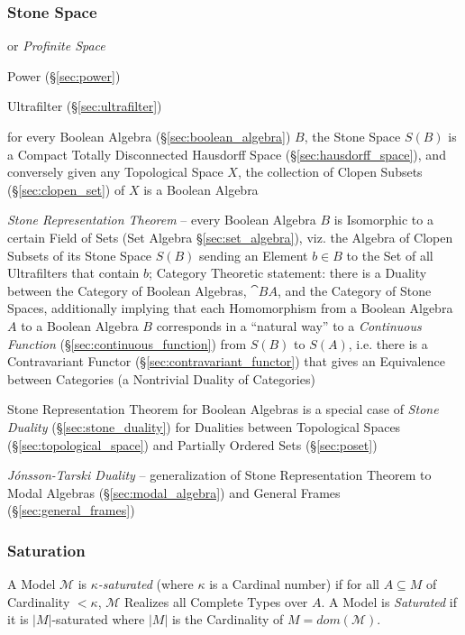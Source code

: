 \subsubsection{Stone Space}\label{sec:stone_space}

or \emph{Profinite Space}

Power (\S\ref{sec:power})

Ultrafilter (\S\ref{sec:ultrafilter})

for every Boolean Algebra (\S\ref{sec:boolean_algebra}) $B$, the Stone Space
$\xspace{S}(B)$ is a Compact Totally Disconnected Hausdorff Space
(\S\ref{sec:hausdorff_space}), and conversely given any Topological Space $X$,
the collection of Clopen Subsets (\S\ref{sec:clopen_set}) of $X$ is a Boolean
Algebra

\emph{Stone Representation Theorem} -- every Boolean Algebra $B$ is Isomorphic
to a certain Field of Sets (Set Algebra \S\ref{sec:set_algebra}), viz. the
Algebra of Clopen Subsets of its Stone Space $\xspace{S}(B)$ sending an Element
$b \in B$ to the Set of all Ultrafilters that contain $b$; Category Theoretic
statement: there is a Duality between the Category of Boolean Algebras,
$\cat{BA}$, and the Category of Stone Spaces, additionally implying that each
Homomorphism from a Boolean Algebra $A$ to a Boolean Algebra $B$ corresponds in
a ``natural way'' to a \emph{Continuous Function}
(\S\ref{sec:continuous_function}) from $S(B)$ to $S(A)$, i.e. there is a
Contravariant Functor (\S\ref{sec:contravariant_functor}) that gives an
Equivalence between Categories (a Nontrivial Duality of Categories)

\fist Stone Representation Theorem for Boolean Algebras is a special case of
\emph{Stone Duality} (\S\ref{sec:stone_duality}) for Dualities between
Topological Spaces (\S\ref{sec:topological_space}) and Partially Ordered Sets
(\S\ref{sec:poset})

\fist \emph{J\'onsson-Tarski Duality} --
generalization of Stone Representation Theorem to Modal Algebras
(\S\ref{sec:modal_algebra}) and General Frames (\S\ref{sec:general_frames})



\subsubsection{Saturation}\label{sec:model_saturation}

A Model $\mathcal{M}$ is \emph{$\kappa$-saturated} (where $\kappa$ is
a Cardinal number) if for all $A \subseteq M$ of Cardinality $<
\kappa$, $\mathcal{M}$ Realizes all Complete Types over $A$. A Model
is \emph{Saturated} if it is $|M|$-saturated where $|M|$ is the
Cardinality of $M = dom(\mathcal{M})$.



